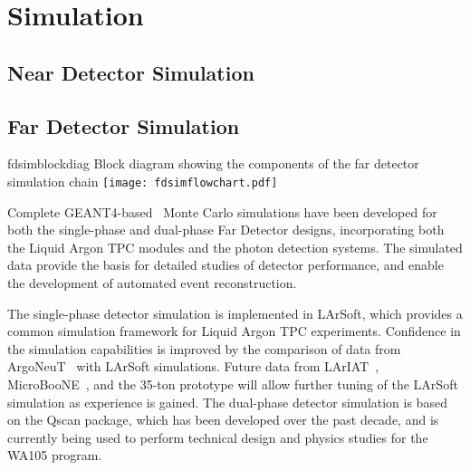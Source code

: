 \chapter{Simulation}
\label{annex:detectors-sc-physics-software-simulation}

\section{Near Detector Simulation}
\label{annex:detectors-sc-physics-software-simulation-nd}

\section{Far Detector Simulation}
\label{annex:detectors-sc-physics-software-simulation-fd}

\begin{cdrfigure}{fdsimblockdiag}
{Block diagram showing the components of the far detector simulation chain}
\texttt{[image: fdsimflowchart.pdf]}
\end{cdrfigure}


%
%
%

Complete GEANT4-based~\cite{geant4} Monte Carlo simulations have been 
developed for both the single-phase and dual-phase Far Detector designs,
incorporating both the Liquid Argon TPC modules
and the photon detection systems. The simulated data provide
the basis for detailed studies of detector performance, 
and enable the development of automated event reconstruction.

The single-phase detector simulation is implemented in LArSoft,
which provides a common simulation framework for Liquid Argon TPC experiments.
Confidence in the simulation capabilities is improved by
the comparison of data from ArgoNeuT~\cite{argoneut} with LArSoft
simulations.  Future data from LArIAT~\cite{lariat},
MicroBooNE~\cite{microboone}, and the 35-ton prototype will allow
further tuning of the LArSoft simulation as experience is gained.
The dual-phase detector simulation is based on the Qscan package,
which has been developed over the past decade, and is currently
being used to perform technical design and physics studies for
the WA105 program.

